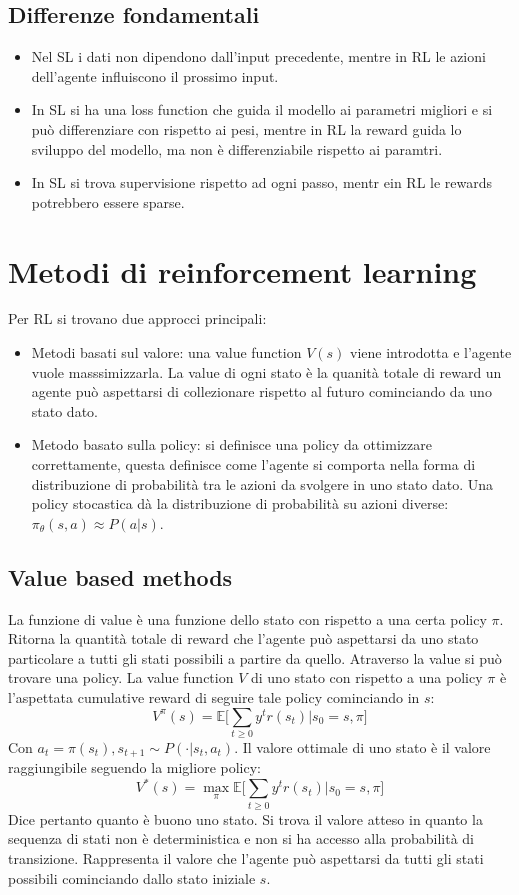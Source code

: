 	\subsection{Differenze fondamentali}
	\begin{itemize}
		\item Nel SL i dati non dipendono dall'input precedente, mentre in RL le azioni dell'agente influiscono il prossimo input.
		\item In SL si ha una loss function che guida il modello ai parametri migliori e si pu\`o differenziare con rispetto ai pesi, mentre in RL la reward guida lo sviluppo del modello, ma non \`e differenziabile rispetto ai paramtri.
		\item In SL si trova supervisione rispetto ad ogni passo, mentr ein RL le rewards potrebbero essere sparse.
	\end{itemize}

\section{Metodi di reinforcement learning}
Per RL si trovano due approcci principali:
\begin{itemize}
	\item Metodi basati sul valore: una value function $V(s)$ viene introdotta e l'agente vuole masssimizzarla.
		La value di ogni stato \`e la quanit\`a totale di reward un agente pu\`o aspettarsi di collezionare rispetto al futuro cominciando da uno stato dato.
	\item Metodo basato sulla policy: si definisce una policy da ottimizzare correttamente, questa definisce come l'agente si comporta nella forma di distribuzione di probabilit\`a tra le azioni da svolgere in uno stato dato.
		Una policy stocastica d\`a la distribuzione di probabilit\`a su azioni diverse: $\pi_\theta(s,a)\approx P(a|s)$.

\end{itemize}

	\subsection{Value based methods}
	La funzione di value \`e una funzione dello stato con rispetto a una certa policy $\pi$.
	Ritorna la quantit\`a totale di reward che l'agente pu\`o aspettarsi da uno stato particolare a tutti gli stati possibili a partire da quello.
	Atraverso la value si pu\`o trovare una policy.
	La value function $V$ di uno stato con rispetto a una policy $\pi$ \`e l'aspettata cumulative reward di seguire tale policy cominciando in $s$:
	$$V^\pi(s) = \mathbb{E}\biggl[\sum\limits_{t\ge 0} y^tr(s_t)|s_0 = s,\pi\biggr]$$
	Con $a_t = \pi(s_t), s_{t+1}\sim P(\cdot|s_t, a_t)$.
	Il valore ottimale di uno stato \`e il valore raggiungibile seguendo la migliore policy:
	$$V^*(s) = \max_\pi\mathbb{E}\biggl[\sum\limits_{t\ge 0} y^tr(s_t)|s_0 = s,\pi\biggr]$$
	Dice pertanto quanto \`e buono uno stato.
	Si trova il valore atteso in quanto la sequenza di stati non \`e deterministica e non si ha accesso alla probabilit\`a di transizione.
	Rappresenta il valore che l'agente pu\`o aspettarsi da tutti gli stati possibili cominciando dallo stato iniziale $s$.

